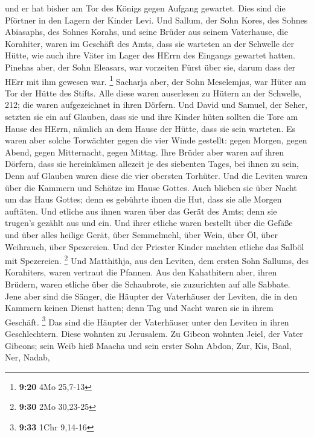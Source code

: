  und er hat bisher am Tor des Königs gegen Aufgang
gewartet. Dies sind die Pförtner in den Lagern der Kinder Levi.
 Und Sallum, der Sohn Kores, des Sohnes Abiasaphs, des
Sohnes Korahs, und seine Brüder aus seinem Vaterhause, die Korahiter,
waren im Geschäft des Amts, dass sie warteten an der Schwelle der Hütte,
wie auch ihre Väter im Lager des HErrn des Eingangs gewartet hatten.
 Pinehas aber, der Sohn Eleasars, war vorzeiten Fürst
über sie, darum dass der HErr mit ihm gewesen war. \footnote{\textbf{9:20}
  4Mo 25,7-13}  Sacharja aber, der Sohn Meselemjas, war
Hüter am Tor der Hütte des Stifts.  Alle diese waren
auserlesen zu Hütern an der Schwelle, 212; die waren aufgezeichnet in
ihren Dörfern. Und David und Samuel, der Seher, setzten sie ein auf
Glauben,  dass sie und ihre Kinder hüten sollten die Tore
am Hause des HErrn, nämlich an dem Hause der Hütte, dass sie sein
warteten.  Es waren aber solche Torwächter gegen die vier
Winde gestellt: gegen Morgen, gegen Abend, gegen Mitternacht, gegen
Mittag.  Ihre Brüder aber waren auf ihren Dörfern, dass
sie hereinkämen allezeit je des siebenten Tages, bei ihnen zu sein,
 Denn auf Glauben waren diese die vier obersten Torhüter.
Und die Leviten waren über die Kammern und Schätze im Hause Gottes.
 Auch blieben sie über Nacht um das Haus Gottes; denn es
gebührte ihnen die Hut, dass sie alle Morgen auftäten. 
Und etliche aus ihnen waren über das Gerät des Amts; denn sie trugen's
gezählt aus und ein.  Und ihrer etliche waren bestellt
über die Gefäße und über alles heilige Gerät, über Semmelmehl, über
Wein, über Öl, über Weihrauch, über Spezereien.  Und der
Priester Kinder machten etliche das Salböl mit Spezereien. \footnote{\textbf{9:30}
  2Mo 30,23-25}  Und Matthithja, aus den Leviten, dem
ersten Sohn Sallums, des Korahiters, waren vertraut die Pfannen.
 Aus den Kahathitern aber, ihren Brüdern, waren etliche
über die Schaubrote, sie zuzurichten auf alle Sabbate. 
Jene aber sind die Sänger, die Häupter der Vaterhäuser der Leviten, die
in den Kammern keinen Dienst hatten; denn Tag und Nacht waren sie in
ihrem Geschäft. \footnote{\textbf{9:33} 1Chr 9,14-16} 
Das sind die Häupter der Vaterhäuser unter den Leviten in ihren
Geschlechtern. Diese wohnten zu Jerusalem.  Zu Gibeon
wohnten Jeiel, der Vater Gibeons; sein Weib hieß Maacha 
und sein erster Sohn Abdon, Zur, Kis, Baal, Ner, Nadab, 
